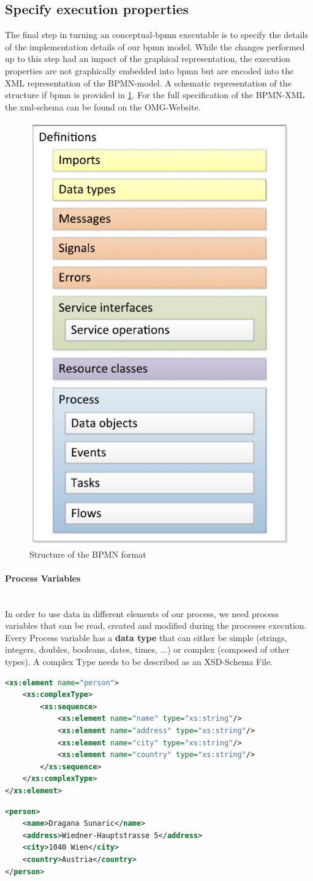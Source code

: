 \subsection{Specify execution properties}
The final step in turning an \gls{conceptual-bpmn} executable is to specify the details of the implementation details of our \gls{bpmn} model. While the changes performed up to this step had an impact of the graphical representation, the execution properties are not graphically embedded into \gls{bpmn} but are encoded into the \gls{XML} representation of the BPMN-model. \cite{fundamentals} A schematic representation of the structure if \gls{bpmn} is provided in \ref{fig:bpmn-schema}. For the full specification of the BPMN-XML the \gls{xml}-schema can be found on the OMG-Website\cite{BPMN-xml-spec}. 
\begin{figure}[H]
		\centering
		\includegraphics[width=0.3\columnwidth]{graphics/bpmn-schema}
		\caption{Structure of the BPMN format \cite{fundamentals}} 
		\label{fig:bpmn-schema} 
\end{figure}


\paragraph{Process Variables}~\\
In order to use data in different elements of our process, we need process variables that can be read, created and modified during the processes execution. Every Process variable has a \textbf{data type} that can either be simple (strings, integers, doubles, booleans, dates, times, ...) or complex (composed of other types). A complex Type needs to be described as an \gls{XSD}-Schema File.\\
	\begin{lstlisting}[language=xml,caption={The \gls{xml}-Schema Definiton for a complex type 'person'},captionpos=b]
<xs:element name="person">
	<xs:complexType>
		<xs:sequence>
			<xs:element name="name" type="xs:string"/>
			<xs:element name="address" type="xs:string"/>
			<xs:element name="city" type="xs:string"/>
			<xs:element name="country" type="xs:string"/>
		</xs:sequence>
	</xs:complexType>
</xs:element>
	\end{lstlisting}
\begin{lstlisting}[language=xml,caption={An instance of the complex type 'person'},captionpos=b]
<person>
	<name>Dragana Sunaric</name>
	<address>Wiedner-Hauptstrasse 5</address>
	<city>1040 Wien</city>
	<country>Austria</country>
</person>
\end{lstlisting}


